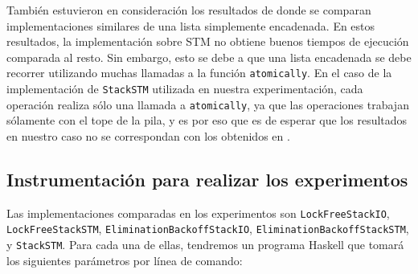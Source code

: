 También estuvieron en consideración los resultados de \cite{linked-list} donde se comparan implementaciones similares de una lista simplemente encadenada.
En estos resultados, la implementación sobre STM no obtiene buenos tiempos de ejecución comparada al resto.
Sin embargo, esto se debe a que una lista encadenada se debe recorrer utilizando muchas llamadas a la función \texttt{atomically}.
En el caso de la implementación de \texttt{StackSTM} utilizada en nuestra experimentación, cada operación realiza sólo una llamada a \texttt{atomically}, ya que las operaciones trabajan sólamente con el tope de la pila, y es por eso que es de esperar que los resultados en nuestro caso no se correspondan con los obtenidos en \cite{linked-list}.

\subsection{Instrumentación para realizar los experimentos}\label{subsec:experiment-harness}
Las implementaciones comparadas en los experimentos son \texttt{LockFreeStackIO}, \\ \texttt{LockFreeStackSTM}, \texttt{EliminationBackoffStackIO}, \texttt{EliminationBackoffStackSTM}, \\ y \texttt{StackSTM}. Para cada una de ellas, tendremos un programa Haskell que tomará los siguientes parámetros por línea de comando:

